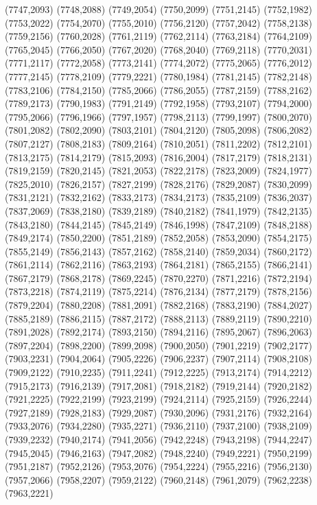 (7747,2093)
(7748,2088)
(7749,2054)
(7750,2099)
(7751,2145)
(7752,1982)
(7753,2022)
(7754,2070)
(7755,2010)
(7756,2120)
(7757,2042)
(7758,2138)
(7759,2156)
(7760,2028)
(7761,2119)
(7762,2114)
(7763,2184)
(7764,2109)
(7765,2045)
(7766,2050)
(7767,2020)
(7768,2040)
(7769,2118)
(7770,2031)
(7771,2117)
(7772,2058)
(7773,2141)
(7774,2072)
(7775,2065)
(7776,2012)
(7777,2145)
(7778,2109)
(7779,2221)
(7780,1984)
(7781,2145)
(7782,2148)
(7783,2106)
(7784,2150)
(7785,2066)
(7786,2055)
(7787,2159)
(7788,2162)
(7789,2173)
(7790,1983)
(7791,2149)
(7792,1958)
(7793,2107)
(7794,2000)
(7795,2066)
(7796,1966)
(7797,1957)
(7798,2113)
(7799,1997)
(7800,2070)
(7801,2082)
(7802,2090)
(7803,2101)
(7804,2120)
(7805,2098)
(7806,2082)
(7807,2127)
(7808,2183)
(7809,2164)
(7810,2051)
(7811,2202)
(7812,2101)
(7813,2175)
(7814,2179)
(7815,2093)
(7816,2004)
(7817,2179)
(7818,2131)
(7819,2159)
(7820,2145)
(7821,2053)
(7822,2178)
(7823,2009)
(7824,1977)
(7825,2010)
(7826,2157)
(7827,2199)
(7828,2176)
(7829,2087)
(7830,2099)
(7831,2121)
(7832,2162)
(7833,2173)
(7834,2173)
(7835,2109)
(7836,2037)
(7837,2069)
(7838,2180)
(7839,2189)
(7840,2182)
(7841,1979)
(7842,2135)
(7843,2180)
(7844,2145)
(7845,2149)
(7846,1998)
(7847,2109)
(7848,2188)
(7849,2174)
(7850,2200)
(7851,2189)
(7852,2058)
(7853,2090)
(7854,2175)
(7855,2149)
(7856,2143)
(7857,2162)
(7858,2140)
(7859,2034)
(7860,2172)
(7861,2114)
(7862,2116)
(7863,2193)
(7864,2181)
(7865,2155)
(7866,2141)
(7867,2179)
(7868,2178)
(7869,2245)
(7870,2270)
(7871,2216)
(7872,2194)
(7873,2218)
(7874,2119)
(7875,2214)
(7876,2134)
(7877,2179)
(7878,2156)
(7879,2204)
(7880,2208)
(7881,2091)
(7882,2168)
(7883,2190)
(7884,2027)
(7885,2189)
(7886,2115)
(7887,2172)
(7888,2113)
(7889,2119)
(7890,2210)
(7891,2028)
(7892,2174)
(7893,2150)
(7894,2116)
(7895,2067)
(7896,2063)
(7897,2204)
(7898,2200)
(7899,2098)
(7900,2050)
(7901,2219)
(7902,2177)
(7903,2231)
(7904,2064)
(7905,2226)
(7906,2237)
(7907,2114)
(7908,2108)
(7909,2122)
(7910,2235)
(7911,2241)
(7912,2225)
(7913,2174)
(7914,2212)
(7915,2173)
(7916,2139)
(7917,2081)
(7918,2182)
(7919,2144)
(7920,2182)
(7921,2225)
(7922,2199)
(7923,2199)
(7924,2114)
(7925,2159)
(7926,2244)
(7927,2189)
(7928,2183)
(7929,2087)
(7930,2096)
(7931,2176)
(7932,2164)
(7933,2076)
(7934,2280)
(7935,2271)
(7936,2110)
(7937,2100)
(7938,2109)
(7939,2232)
(7940,2174)
(7941,2056)
(7942,2248)
(7943,2198)
(7944,2247)
(7945,2045)
(7946,2163)
(7947,2082)
(7948,2240)
(7949,2221)
(7950,2199)
(7951,2187)
(7952,2126)
(7953,2076)
(7954,2224)
(7955,2216)
(7956,2130)
(7957,2066)
(7958,2207)
(7959,2122)
(7960,2148)
(7961,2079)
(7962,2238)
(7963,2221)
